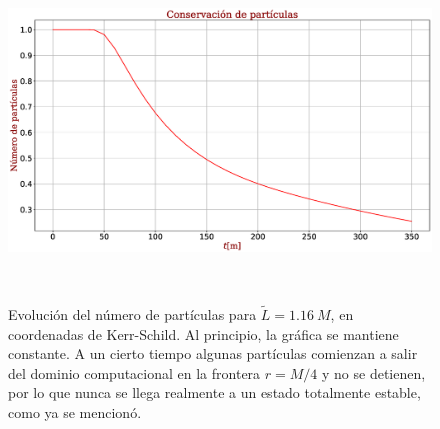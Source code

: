 \documentclass[11pt,twoside,openright,spanish]{report}
\numberwithin{equation}{chapter}
\numberwithin{figure}{chapter}
\numberwithin{table}{chapter}
\begin{document}
\begin{figure}[H]
	\centering
	\includegraphics[height=9cm]{graphs_study/LmenorKSGraphs/numpartKSMenor.eps}
	\caption{Evolución del número de partículas para $\tilde{L}=1.16\ M$, en coordenadas de Kerr-Schild. Al principio, la gráfica se mantiene constante. A un cierto tiempo algunas partículas comienzan a salir del dominio computacional en la frontera $r=M/4$ y no se detienen, por lo que nunca se llega realmente a un estado totalmente estable, como ya se mencionó.}
	\label{numpartKSMenor}
\end{figure}
\end{document}
